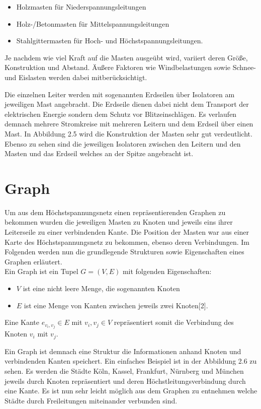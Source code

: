 \begin{itemize}
	\item Holzmasten für Niederspannungsleitungen 
	\item Holz-/Betonmasten für Mittelspannungsleitungen
	\item Stahlgittermasten für Hoch- und Höchstspannungsleitungen.
\end{itemize} 

Je nachdem wie viel Kraft auf die Masten ausgeübt wird, variiert deren Größe, Konstruktion und Abstand. Äußere Faktoren wie Windbelastungen sowie Schnee- und Eislasten werden dabei mitberücksichtigt.

Die einzelnen Leiter werden mit sogenannten Erdseilen über Isolatoren am jeweiligen Mast angebracht. Die Erdseile dienen dabei nicht dem Transport der elektrischen Energie sondern dem Schutz vor Blitzeinschlägen. Es verlaufen demnach mehrere Stromkreise mit mehreren Leitern und dem Erdseil über einen Mast. In Abbildung 2.5 wird die Konstruktion der Masten sehr gut verdeutlicht. Ebenso zu sehen sind die jeweiligen Isolatoren zwischen den Leitern und den Masten und das Erdseil welches an der Spitze angebracht ist.

\section{Graph}
\label{Graph}
%

Um aus dem Höchstspannungsnetz einen repräsentierenden Graphen zu bekommen wurden die jeweiligen Masten zu Knoten und jeweils eins ihrer Leiterseile zu einer verbindenden Kante. Die Position der Masten war aus einer Karte des Höchstspannungsnetz zu bekommen, ebenso deren Verbindungen. Im Folgenden werden nun die grundlegende Strukturen sowie Eigenschaften eines Graphen erläutert. \\

Ein Graph ist ein Tupel $G = (V,E)$ mit folgenden Eigenschaften:

\begin{itemize}
	\item $V$ ist eine nicht leere Menge, die sogenannten Knoten
	\item $E$ ist eine Menge von Kanten zwischen jeweils zwei Knoten[2].
\end{itemize} 

Eine Kante $e_{v_{i},v_{j}} \in E$ mit $v_{i},v_{j} \in V$ repräsentiert somit die Verbindung des Knoten $v_{i}$ mit $v_{j}$.

Ein Graph ist demnach eine Struktur die Informationen anhand Knoten und verbindenden Kanten speichert. Ein einfaches Beispiel ist in der Abbildung 2.6 zu sehen. Es werden die Städte Köln, Kassel, Frankfurt, Nürnberg und München jeweils durch Knoten repräsentiert und deren Höchstleitungsverbindung durch eine Kante. Es ist nun sehr leicht möglich aus dem Graphen zu entnehmen welche Städte durch Freileitungen miteinander verbunden sind.\\

